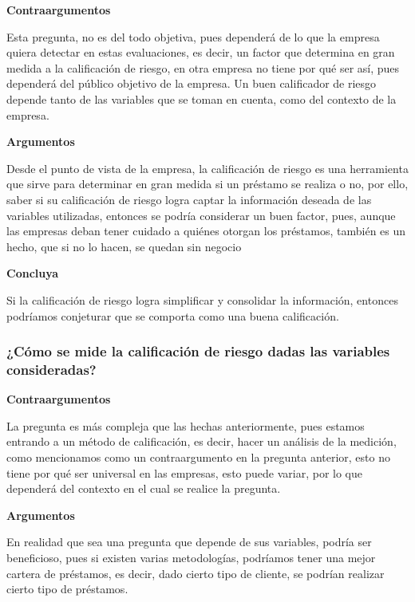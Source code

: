 \documentclass[
  letterpaper,
  DIV=11,
  numbers=noendperiod]{scrreprt}
\begin{document}
\textbf{Contraargumentos}

Esta pregunta, no es del todo objetiva, pues dependerá de lo que la
empresa quiera detectar en estas evaluaciones, es decir, un factor que
determina en gran medida a la calificación de riesgo, en otra empresa no
tiene por qué ser así, pues dependerá del público objetivo de la
empresa. Un buen calificador de riesgo depende tanto de las variables
que se toman en cuenta, como del contexto de la empresa.

\textbf{Argumentos}

Desde el punto de vista de la empresa, la calificación de riesgo es una
herramienta que sirve para determinar en gran medida si un préstamo se
realiza o no, por ello, saber si su calificación de riesgo logra captar
la información deseada de las variables utilizadas, entonces se podría
considerar un buen factor, pues, aunque las empresas deban tener cuidado
a quiénes otorgan los préstamos, también es un hecho, que si no lo
hacen, se quedan sin negocio

\textbf{Concluya}

Si la calificación de riesgo logra simplificar y consolidar la
información, entonces podríamos conjeturar que se comporta como una
buena calificación.

\subsubsection{\texorpdfstring{\textbf{¿Cómo se mide la calificación de
riesgo dadas las variables
consideradas?}}{¿Cómo se mide la calificación de riesgo dadas las variables consideradas?}}\label{cuxf3mo-se-mide-la-calificaciuxf3n-de-riesgo-dadas-las-variables-consideradas}

\textbf{Contraargumentos}

La pregunta es más compleja que las hechas anteriormente, pues estamos
entrando a un método de calificación, es decir, hacer un análisis de la
medición, como mencionamos como un contraargumento en la pregunta
anterior, esto no tiene por qué ser universal en las empresas, esto
puede variar, por lo que dependerá del contexto en el cual se realice la
pregunta.

\textbf{Argumentos}

En realidad que sea una pregunta que depende de sus variables, podría
ser beneficioso, pues si existen varias metodologías, podríamos tener
una mejor cartera de préstamos, es decir, dado cierto tipo de cliente,
se podrían realizar cierto tipo de préstamos.
\end{document}
